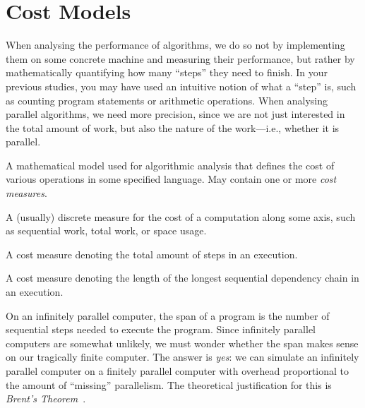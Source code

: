\chapter{Cost Models}

When analysing the performance of algorithms, we do so not by
implementing them on some concrete machine and measuring their
performance, but rather by mathematically quantifying how many
``steps'' they need to finish. In your previous studies, you may have
used an intuitive notion of what a ``step'' is, such as counting
program statements or arithmetic operations. When analysing parallel
algorithms, we need more precision, since we are not just interested
in the total amount of work, but also the nature of the work---i.e.,
whether it is parallel.

\begin{definition}
  A mathematical model used for algorithmic analysis that defines the
  cost of various operations in some specified language. May contain
  one or more \emph{cost measures}.
\end{definition}

\begin{definition}
  A (usually) discrete measure for the cost of a computation along
  some axis, such as sequential work, total work, or space usage.
\end{definition}

\begin{definition}[Work]
  A cost measure denoting the total amount of steps in an execution.
\end{definition}

\begin{definition}
  A cost measure denoting the length of the longest sequential
  dependency chain in an execution.
\end{definition}

On an infinitely parallel computer, the span of a program is the
number of sequential steps needed to execute the program. Since
infinitely parallel computers are somewhat unlikely, we must wonder
whether the span makes sense on our tragically finite computer. The
answer is \emph{yes}: we can simulate an infinitely parallel computer
on a finitely parallel computer with overhead proportional to the
amount of ``missing'' parallelism. The theoretical justification for
this is \emph{Brent's Theorem}~\cite{10.1145/321812.321815}.

